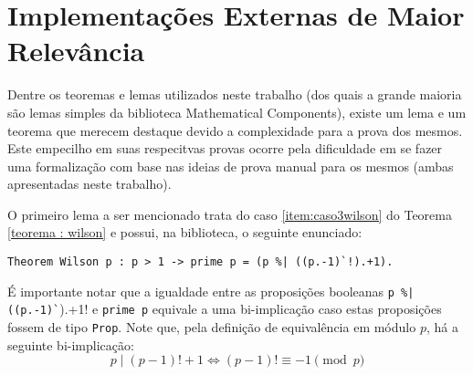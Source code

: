 
\section{Implementações Externas de Maior Relevância}
\label{sec:implementacoes}

Dentre os teoremas e lemas utilizados neste trabalho (dos quais a grande maioria são lemas simples da biblioteca Mathematical Components), existe um lema e um teorema que merecem destaque devido a complexidade para a prova dos mesmos. Este empecilho em suas respecitvas provas ocorre pela dificuldade em se fazer uma formalização com base nas ideias de prova manual para os mesmos (ambas apresentadas neste trabalho).

O primeiro lema a ser mencionado trata do caso \ref{item:caso3wilson} do Teorema \ref{teorema : wilson} e possui, na biblioteca, o seguinte enunciado:
        \begin{lstlisting}[language=coq,frame=single,tabsize=1]
Theorem Wilson p : p > 1 -> prime p = (p %| ((p.-1)`!).+1).
        \end{lstlisting}
É importante notar que a igualdade entre as proposições booleanas \lstinline[language=coq]!p %| ((p.-1)`!).+1! e \lstinline[language=coq]!prime p! equivale a uma bi-implicação caso estas proposições fossem de tipo \lstinline[language=coq]|Prop|. Note que, pela definição de equivalência em módulo $p$, há a seguinte bi-implicação:
        \begin{equation}
                p \mid (p-1)! + 1 \Longleftrightarrow (p-1)! \equiv -1 \pmod{p} 
        \end{equation}

